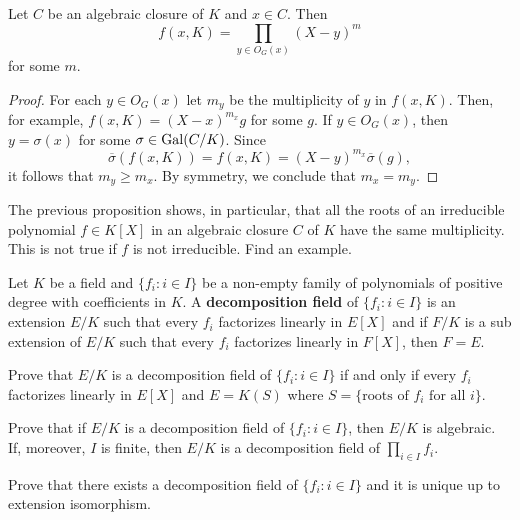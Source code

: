 \begin{proposition}
    Let $C$ be an algebraic closure of $K$ and $x\in C$. Then 
    \[
    f(x,K)=\prod_{y\in O_G(x)}(X-y)^m
    \]
    for some $m$. 
\end{proposition}

\begin{proof}
    For each $y\in O_G(x)$ let $m_y$ be the multiplicity
    of $y$ in $f(x,K)$. 
    Then, for example,
    $f(x,K)=(X-x)^{m_x}g$ for some $g$. If $y\in O_G(x)$, 
    then $y=\sigma(x)$ for some $\sigma\in\operatorname{Gal}(C/K)$. Since
    \[
    \overline{\sigma}(f(x,K))=f(x,K)=(X-y)^{m_x}\overline{\sigma}(g), 
    \]
    it follows that $m_y\geq m_x$. By symmetry, 
    we conclude that $m_x=m_y$. 
\end{proof}

The previous proposition shows, in particular, 
that all the roots of 
an irreducible polynomial $f\in K[X]$ 
in an algebraic closure $C$ of $K$
have the same multiplicity. This is  
not true if $f$ is not irreducible. Find an example.



\begin{definition}
    Let $K$ be a field and $\{f_i:i\in I\}$ be a non-empty 
    family of polynomials of positive degree
    with coefficients in $K$. A \textbf{decomposition field} 
    of $\{f_i:i\in I\}$ is an extension $E/K$
    such that every $f_i$ factorizes linearly in $E[X]$ and 
    if $F/K$ is a sub extension of $E/K$ such that every $f_i$ 
    factorizes linearly in $F[X]$, then $F=E$. 
\end{definition}

\begin{exercise}
    Prove that $E/K$ is a decomposition field of
    $\{f_i:i\in I\}$ if and only if every $f_i$ factorizes linearly 
    in $E[X]$ and $E=K(S)$ where $S=\{\text{roots of $f_i$ for all $i$}\}$. 
\end{exercise}

\begin{exercise}
    Prove that if $E/K$ is a decomposition field
    of $\{f_i:i\in I\}$, then $E/K$ is algebraic. If, moreover, 
    $I$ is finite, then $E/K$ is a decomposition field
    of $\prod_{i\in I}f_i$. 
\end{exercise}

\begin{exercise}
    Prove that 
    there exists a decomposition field of $\{f_i:i\in I\}$ 
    and it is unique up to extension isomorphism. 
\end{exercise}

